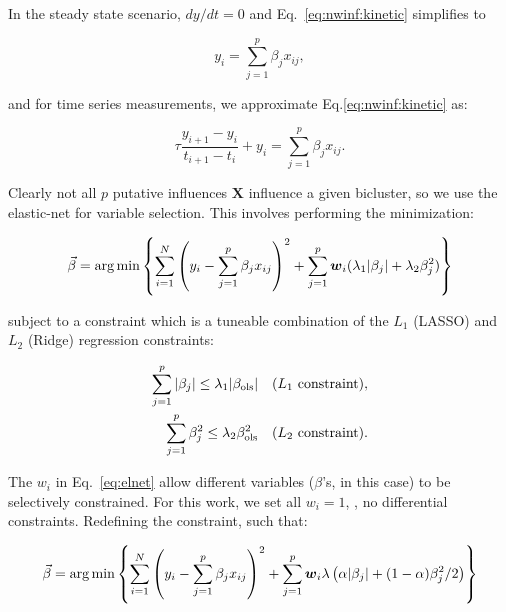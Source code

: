\noindent In the steady state scenario, $dy/dt=0$ and Eq.~\ref{eq:nwinf:kinetic} simplifies to

\begin{equation*}
y_{i}=\sum_{j=1}^{p}\beta_j x_{ij} ,
\end{equation*}

\noindent and for time series measurements, we approximate Eq.\ref{eq:nwinf:kinetic} as:

\begin{equation*}
\tau\frac{y_{i+1}-y_{i}}{t_{i+1}-t_i} + y_{i} = \sum_{j=1}^{p}\beta_j x_{ij} .
\end{equation*}

\noindent Clearly not all $p$ putative influences $\mathbf{X}$ influence a given bicluster, so we use the elastic-net \cite{zou_regularization_2005} for variable selection. This involves performing the minimization:

\begin{equation}
\label{eq:elnet}
 \vec{\beta} = \arg \min \left\{ \sum^N_{i = 1} \left( y_i - \sum^p_{j = 1} \beta_j x_{ij} \right)^2 + \sum_{j = 1}^p
   \boldsymbol{w}_i ( \lambda_1 | \beta_j | + \lambda_2 \beta^2_j) \right\}
\end{equation}

\noindent subject to a constraint which is a tuneable combination of the $L_1$ (LASSO) and $L_2$ (Ridge) regression constraints:

\vspace{-0.4in}

\begin{eqnarray*}
\label{eq:elnet:constraint}
\sum_{j = 1}^p | \beta_j | \leq \lambda_1 | \beta_{\operatorname{ols}} | & & \mathrm{(}L_1\ \mathrm{constraint)}, \\
\sum_{j = 1}^p \beta^2_j \leq \lambda_2 \beta^2_{\operatorname{ols}}     & & \mathrm{(}L_2\ \mathrm{constraint)}.
\end{eqnarray*}

\noindent The $w_i$ in Eq.~\ref{eq:elnet} allow different variables ($\beta$'s, in this case) to be selectively constrained. For this work, we set all $w_i=1$, \ie, no differential constraints. Redefining the constraint, such that:

\begin{equation}
\label{eq:elnet2}
 \vec{\beta} = \arg \min \left\{ \sum^N_{i = 1} \left( y_i - \sum^p_{j = 1} \beta_j x_{ij} \right)^2 + \sum_{j = 1}^p
   \boldsymbol{w}_i \lambda \left( \alpha | \beta_j | + (1-\alpha) \beta^2_j /2\right) \right\}
\end{equation}

